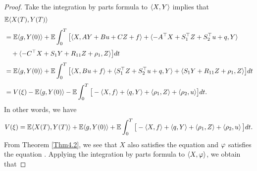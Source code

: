 \documentclass[11pt,times,twoside]{article}
\def\dbE{\mathbb{E}} \def\sE{\mathscr{E}} \def\fE{\mathfrak{E}} \def\cE{{\cal E}} \def\BE{{\bf E}} \def\Be{{\bf e}}
\def\tb{\textcolor{blue}} \def\ae{\hbox{\rm a.e.}}           \def\({\Big (}
\def\a{\alpha}        \def\G{\Gamma}   \def\g{\gamma}   \def\O{\Omega}   \def\o{\omega}
\begin{document}
\begin{proof}
%
Take the integration by parts formula to $\left\langle X,Y\right\rangle$ implies that
%
\begin{align*}
\ds &\dbE \lan  X(T), Y(T)\ran \\
%
\ns\ds &= \dbE \lan  g, Y(0)\ran
  +\dbE  \int_{0}^{T}\big[\lan  X, A Y+B u+C Z +f \ran
  +\lan -A^{\top} X+S_{1}^{\top} Z+S_{2}^{\top} u +q, Y\ran \\
%
\ns\ds & \q +\lan -C^{\top} X+S_{1} Y+R_{11} Z +\rho_1, Z\ran \big] d t \\
%
\ns\ds &=  \dbE \lan  g, Y(0)\ran
+\dbE  \int_{0}^{T}\big[\lan  X, Bu +f \ran
+\lan  S_{1}^{\top} Z+S_{2}^{\top} u +q , Y\ran
+\lan  S_{1} Y+R_{11} Z +\rho_1 , Z\ran \big] d t \\
%
\ns\ds &= V(\xi)- \dbE \lan g, Y(0)\ran
-\dbE  \int_{0}^{T}\big[
 -\lan  X,  f \ran
 +\lan  q , Y\ran
 +\lan  \rho_1 , Z\ran
 +\lan  \rho_2, u \ran
\big] dt.
%
\end{align*}
%
In other words, we have
%
$$\begin{aligned}
%
V(\xi)
=\dbE \lan  X(T), Y(T)\ran  + \dbE \lan  g, Y(0)\ran
+\dbE  \int_{0}^{T}\big[
 -\lan  X,  f \ran
 +\lan  q , Y\ran
 +\lan  \rho_1 , Z\ran
 +\left\lan  \rho_2, u\right\ran
\big] dt.
%
\end{aligned}$$
%
From Theorem \ref{Thm4.2}, we see that $X$ also satisfies the equation  and $\varphi$ satisfies the equation . Applying the integration by parts formula to  $\left\langle X,\varphi\right\rangle$, we obtain that
%

\end{proof}
\end{document}
